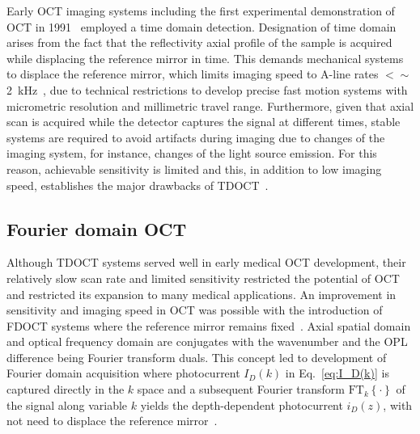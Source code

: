 Early OCT imaging systems including the first experimental demonstration of OCT in 1991~\cite{Huang1991_Optical} employed a time domain detection. Designation of time domain arises from the fact that the reflectivity axial profile of the sample is acquired while displacing the reference mirror in time. This demands mechanical systems to displace the reference mirror, which limits imaging speed to A-line rates $<\sim$2~kHz~\cite{Izatt2015_Theory}, due to technical restrictions to develop precise fast motion systems with micrometric resolution and millimetric travel range. Furthermore, given that axial scan is acquired while the detector captures the signal at different times, stable systems are required to avoid artifacts during imaging due to changes of the imaging system, for instance, changes of the light source emission. For this reason, achievable sensitivity is limited and this, in addition to low imaging speed, establishes the major drawbacks of TDOCT~\cite{Leitgeb2003_Performance}.

\subsection{Fourier domain OCT}

Although TDOCT systems served well in early medical OCT development, their relatively slow scan rate and limited sensitivity restricted the potential of OCT and restricted its expansion to many medical applications. An improvement in sensitivity and imaging speed in OCT was possible with the introduction of FDOCT systems where the reference mirror remains fixed~\cite{Choma2003_Sensitivity, Leitgeb2003_Performance, deBoer2003_Improved}. Axial spatial domain and optical frequency domain are conjugates with the wavenumber and the OPL difference being Fourier transform duals. This concept led to development of Fourier domain acquisition where photocurrent $I_D(k)$ in Eq.~\eqref{eq:I_D(k)} is captured directly in the $k$ space and a subsequent Fourier transform $\text{FT}_k\left\{\cdot\right\}$ of the signal  along variable $k$ yields the depth-dependent photocurrent $i_D(z)$, with not need to displace the reference mirror~\cite{Fercher1995_Measurement}.

